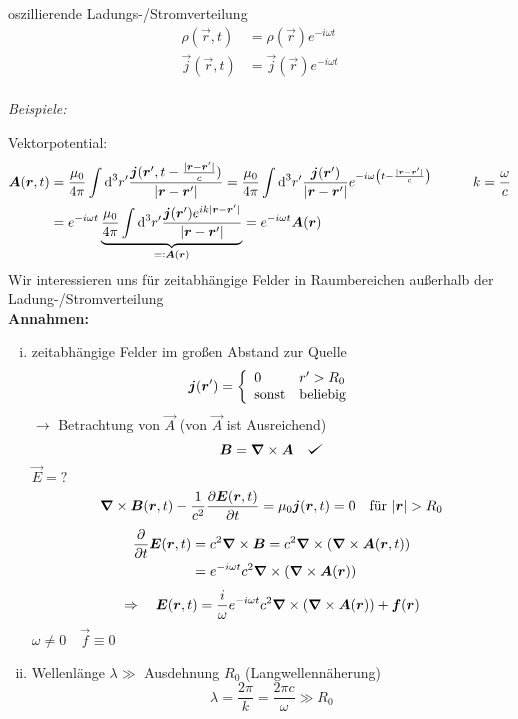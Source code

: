 oszillierende Ladungs-/Stromverteilung
\begin{align*}
\rho(\vec{r},t) &= \rho(\vec{r}) e^{- i \omega t}\\
\vec{j}(\vec{r},t) &= \vec{j}(\vec{r}) e^{- i \omega t}
\end{align*}
\\
\emph{Beispiele:}
%
%
%
%
%
%

\noindent
Vektorpotential:
\begin{align*}
\vec{A}(\vec{r},t) &= \frac{\mu_0}{4 \pi} \int \dd^3 r' \frac{\vec{j}(\vec{r}', t - \frac{|\vec{r} - \vec{r}'|}{c})}{|\vec{r} - \vec{r}'|} = \frac{\mu_0}{4 \pi} \int \dd^3 r' \frac{\vec{j}(\vec{r}')}{|\vec{r} - \vec{r}'|} e^{-i\omega \left(t - \frac{|\vec{r} - \vec{r}'|}{c}\right)} \qquad \quad k = \frac{\omega}{c} \\
&= e^{-i\omega t} \ub{\frac{\mu_0}{4 \pi} \int \dd^3 r' \frac{\vec{j}(\vec{r}') e^{i k |\vec{r} - \vec{r}'|}}{|\vec{r} - \vec{r}'|}}_{\eqdef \vec{A}(\vec{r})} = e^{ - i \omega t} \vec{A}(\vec{r})
\end{align*}
Wir interessieren uns für zeitabhängige Felder in Raumbereichen außerhalb der Ladung-/Strom\-verteilung\\[5pt]
\textbf{Annahmen:}
\begin{enumerate}[i)]
	\item zeitabhängige Felder im großen Abstand zur Quelle
	\begin{equation*}
	\bm{j} (\bm{r}') = \left\{ \begin{array}{ll} {0} & {r' > R_0} \\ {\textrm{sonst}} & {\textrm{beliebig}} \end{array} \right.
	\end{equation*}
	$ \rightarrow $ Betrachtung von $ \vec{A} $ (von $ \vec{A} $ ist Ausreichend)
	\begin{equation*}
	\vec{B} = \vabla \times \vec{A} \quad \checkmark
	\end{equation*}
	$ \vec{E} = ? $
	\begin{align*}
	\bm{\nabla} \times \bm{B}(\bm{r},t) - \frac{1}{c^2} \frac{\partial \bm{E}(\bm{r},t)}{\partial t} = \mu_0 \bm{j}(\bm{r},t) = 0 \quad \textrm{für } |\bm{r}| > R_0
	\end{align*}
	\begin{align*}
	\frac{\partial }{\partial t} \bm{E}(\bm{r},t) &= c^2 \bm{\nabla} \times \bm{B} = c^2 \bm{\nabla} \times (\bm{\nabla} \times \bm{A}(\bm{r},t))\\
	&= e^{-i\omega t} c^2 \bm{\nabla} \times (\bm{\nabla} \times \bm{A}(\bm{r}))
	\end{align*}
	\begin{equation*}
	\Rightarrow \quad \bm{E}(\bm{r},t) = \frac{i}{\omega} e^{-i\omega t} c^2 \bm{\nabla} \times (\bm{\nabla} \times \bm{A}(\bm{r})) + \bm{f}(\bm{r})
	\end{equation*}
	$ \omega \neq 0 \quad \vec{f} \equiv 0 $
	\item Wellenlänge $ \lambda \gg $ Ausdehnung $ R_0 $ (Langwellennäherung)
	\begin{equation*}
	\lambda = \frac{2 \pi}{k} = \frac{2 \pi c}{\omega} \gg R_0
	\end{equation*}
\end{enumerate}
